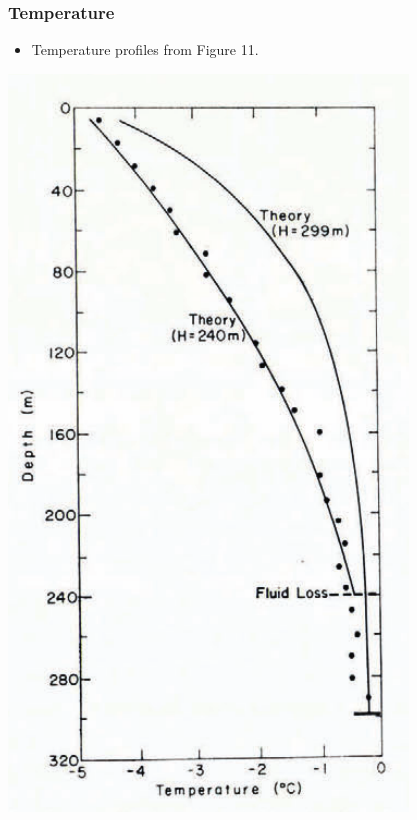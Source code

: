 \documentclass[article,a4paper,times,11pt,twoside]{article}
\begin{document}
\subsubsection{Temperature}
\label{sec:orgf31c057}

\begin{itemize}
\item Temperature profiles from \textcite{colbeck_1979} Figure 11.
\end{itemize}

\begin{center}
\includegraphics[width=.9\linewidth]{isua_14/isua_14.png}
\end{center}
\end{document}
